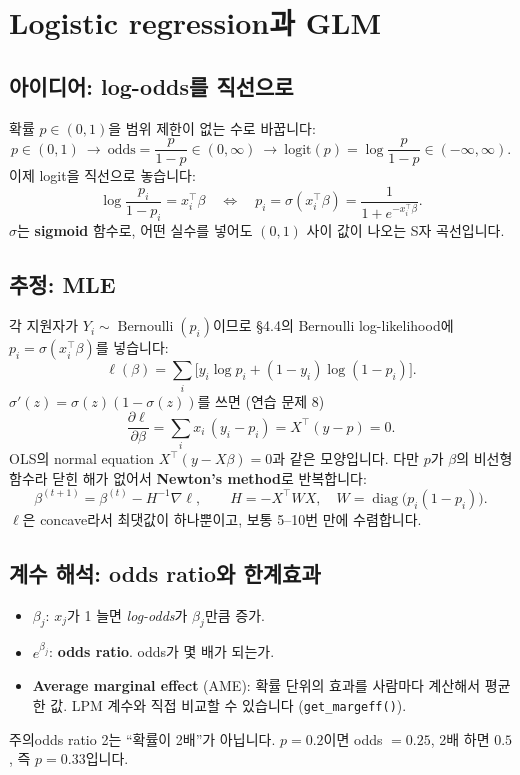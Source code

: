 \documentclass[11pt,a4paper]{article}
\newcommand{\Bern}{\operatorname{Bernoulli}}
\newcommand{\term}[1]{\textbf{#1}}
\newcommand{\warn}{\textsf{\small 주의}\;}
\newcommand{\code}[1]{\texttt{#1}}
\begin{document}
\section{Logistic regression과 GLM}

\subsection{아이디어: log-odds를 직선으로}
확률 $p\in(0,1)$을 범위 제한이 없는 수로 바꿉니다:
\[
p\in(0,1)\ \longrightarrow\ \text{odds}=\frac p{1-p}\in(0,\infty)\ \longrightarrow\ \text{logit}(p)=\log\frac p{1-p}\in(-\infty,\infty).
\]
이제 logit을 직선으로 놓습니다:
\[
\log\frac{p_i}{1-p_i}=x_i^\top\beta\quad\Longleftrightarrow\quad p_i=\sigma(x_i^\top\beta)=\frac1{1+e^{-x_i^\top\beta}}.
\]
$\sigma$는 \term{sigmoid} 함수로, 어떤 실수를 넣어도 $(0,1)$ 사이 값이 나오는 S자 곡선입니다.

\subsection{추정: MLE}
각 지원자가 $Y_i\sim\Bern(p_i)$이므로 \S4.4의 Bernoulli log-likelihood에 $p_i=\sigma(x_i^\top\beta)$를 넣습니다:
\[
\ell(\beta)=\sum_i\big[y_i\log p_i+(1-y_i)\log(1-p_i)\big].
\]
$\sigma'(z)=\sigma(z)(1-\sigma(z))$를 쓰면 (연습 문제 8)
\[
\frac{\partial\ell}{\partial\beta}=\sum_i x_i\,(y_i-p_i)=X^\top(y-p)=0.
\]
OLS의 normal equation $X^\top(y-X\beta)=0$과 같은 모양입니다. 다만 $p$가 $\beta$의 비선형 함수라 닫힌 해가 없어서 \term{Newton's method}로 반복합니다:
\[
\beta^{(t+1)}=\beta^{(t)}-H^{-1}\nabla\ell,\qquad H=-X^\top WX,\quad W=\operatorname{diag}\big(p_i(1-p_i)\big).
\]
$\ell$은 concave라서 최댓값이 하나뿐이고, 보통 5–10번 만에 수렴합니다.

\subsection{계수 해석: odds ratio와 한계효과}
\begin{itemize}
\item $\beta_j$: $x_j$가 1 늘면 \emph{log-odds}가 $\beta_j$만큼 증가.
\item $e^{\beta_j}$: \term{odds ratio}. odds가 몇 배가 되는가.
\item \term{Average marginal effect} (AME): 확률 단위의 효과를 사람마다 계산해서 평균한 값. LPM 계수와 직접 비교할 수 있습니다 (\code{get\_margeff()}).
\end{itemize}
\warn odds ratio 2는 ``확률이 2배''가 아닙니다. $p=0.2$이면 odds $=0.25$, 2배 하면 $0.5$, 즉 $p=0.33$입니다.
\end{document}
